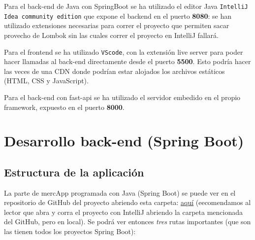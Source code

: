 \documentclass[a4paper,12pt]{report}
\begin{document}
				Para el back-end de Java con SpringBoot se ha utilizado el editor Java \texttt{IntelliJ Idea community edition} que expone el backend en el puerto\textbf{ 8080}: se han utilizado extensiones necesarias para correr el proyecto que permiten sacar provecho de Lombok sin las cuales correr el proyecto en IntelliJ fallará.
				
				Para el frontend se ha utilizado \texttt{VScode}, con la extensión live server para poder hacer llamadas al back-end directamente desde el puerto \textbf{5500}. Esto podría hacer las veces de una CDN donde podrían estar alojados los archivos estáticos (HTML, CSS y JavaScript).
				
				Para el back-end con fast-api se ha utilizado el servidor embedido en el propio framework, expuesto en el puerto \textbf{8000}.
		
	
		
			

			
			\section{Desarrollo back-end (Spring Boot)}
			
				\subsection{Estructura de la aplicación}
				\label{sec:estructuraAplicacion}
				
				La parte de mercApp programada con Java (Spring Boot) se puede ver en el repositorio de GitHub del proyecto abriendo esta carpeta: \href{https://github.com/blackcub3s/mercApp/tree/main/APP%20WEB/__springboot__produccio__/app}{aquí} (eecomendamos al lector que abra y corra el proyecto con IntelliJ abriendo la carpeta mencionada del GitHub, pero en local). Se podrá ver entonces \textit{tres} rutas importantes (que son las tienen todos los proyectos Spring Boot):
				
\end{document}
